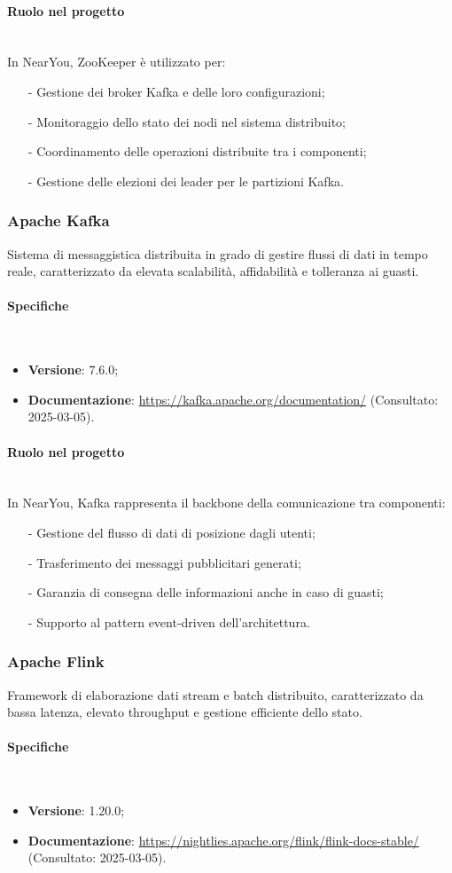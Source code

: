 \documentclass[10pt]{article}
\newcommand{\myparagraph}[1]{\paragraph{#1}\mbox{}\\}
\begin{document}
\myparagraph{Ruolo nel progetto}
In NearYou, ZooKeeper è utilizzato per:
\begin{itemize}
    \item[-] Gestione dei broker Kafka e delle loro configurazioni;
    \item[-] Monitoraggio dello stato dei nodi nel sistema distribuito;
    \item[-] Coordinamento delle operazioni distribuite tra i componenti;
    \item[-] Gestione delle elezioni dei leader per le partizioni Kafka.
\end{itemize}

\subsubsection{Apache Kafka}
Sistema di messaggistica distribuita in grado di gestire flussi di dati in tempo reale, caratterizzato da elevata scalabilità, affidabilità e tolleranza ai guasti.

\myparagraph{Specifiche}
\begin{itemize}
    \item \textbf{Versione}: 7.6.0;
    \item \textbf{Documentazione}: \textcolor{blue}{\url{https://kafka.apache.org/documentation/}} (Consultato: 2025-03-05).
\end{itemize}

\myparagraph{Ruolo nel progetto}
In NearYou, Kafka rappresenta il backbone della comunicazione tra componenti:
\begin{itemize}
    \item[-] Gestione del flusso di dati di posizione dagli utenti;
    \item[-] Trasferimento dei messaggi pubblicitari generati;
    \item[-] Garanzia di consegna delle informazioni anche in caso di guasti;
    \item[-] Supporto al pattern event-driven dell'architettura.
\end{itemize}

\subsubsection{Apache Flink}
Framework di elaborazione dati stream e batch distribuito, caratterizzato da bassa latenza, elevato throughput e gestione efficiente dello stato.

\myparagraph{Specifiche}
\begin{itemize}
    \item \textbf{Versione}: 1.20.0;
    \item \textbf{Documentazione}: \textcolor{blue}{\url{https://nightlies.apache.org/flink/flink-docs-stable/}} (Consultato: 2025-03-05).
\end{itemize}
\end{document}
